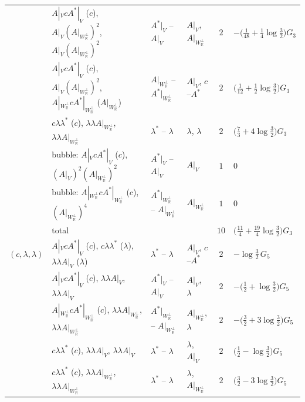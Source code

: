 \begin{tabular}{l|l|l|l|c|l}
 & $A|_VcA^*|_V$ ($c$), $A|_V(A|_{W_{\mathbb R}^\perp})^2$, $A|_V(A|_{W_{\mathbb R}^\perp})^2$ & $A^*|_V$ -- $A|_V$ & $A|_V$, $A|_{W_{\mathbb R}^\perp}$ & $2$ & $-\big(\tfrac1{48}+\tfrac14\log\tfrac32\big)G_3$ \\
 & $A|_VcA^*|_V$ ($c$), $A|_V(A|_{W_{\mathbb R}^\perp})^2$, $A|_{W_{\mathbb R}^\perp}cA^*|_{W_{\mathbb R}^\perp}$ ($A|_{W_{\mathbb R}^\perp}$) & $A|_{W_{\mathbb R}^\perp}$ -- $A^*|_{W_{\mathbb R}^\perp}$ & $A|_V$, $c$--$A^*$ & $2$ & $\big(\tfrac1{12}+\tfrac12\log\tfrac32\big)G_3$ \\
 & $c\lambda\lambda^*$ ($c$), $\lambda\lambda A|_{W_{\mathbb R}^\perp}$, $\lambda\lambda A|_{W_{\mathbb R}^\perp}$ & $\lambda^*$ -- $\lambda$ & $\lambda$, $\lambda$ & $2$ & $\big(\tfrac73+4\log\tfrac32\big)G_3$ \\
 & bubble: $A|_VcA^*|_V$ ($c$), $(A|_V)^2(A|_{W_{\mathbb R}^\perp})^2$ & $A^*|_V$ -- $A|_V$ & $A|_V$ & $1$ & $0$ \\
 & bubble: $A|_{W_{\mathbb R}^\perp}cA^*|_{W_{\mathbb R}^\perp}$ ($c$), $(A|_{W_{\mathbb R}^\perp})^4$ & $A^*|_{W_{\mathbb R}^\perp}$ -- $A|_{W_{\mathbb R}^\perp}$ & $A|_{W_{\mathbb R}^\perp}$ & $1$ & $0$ \\
 & total & & & $10$ & $\big(\tfrac{11}4+\tfrac{19}4\log\tfrac32\big)G_3$ \\
\hline
$(c,\lambda,\lambda)$ & $A|_VcA^*|_V$ ($c$), $c\lambda\lambda^*$ ($\lambda$), $\lambda\lambda A|_V$ ($\lambda$) & $\lambda^*$ -- $\lambda$ & $A|_V$, $c$--$A^*$ & $2$ & $-\log\tfrac32\,G_5$ \\
 & $A|_VcA^*|_V$ ($c$), $\lambda\lambda A|_V$, $\lambda\lambda A|_V$ & $A^*|_V$ -- $A|_V$ & $A|_V$, $\lambda$ & $2$ & $-\big(\tfrac12+\log\tfrac32\big)G_5$ \\
 & $A|_{W_{\mathbb R}^\perp}cA^*|_{W_{\mathbb R}^\perp}$ ($c$), $\lambda\lambda A|_{W_{\mathbb R}^\perp}$, $\lambda\lambda A|_{W_{\mathbb R}^\perp}$ & $A^*|_{W_{\mathbb R}^\perp}$ -- $A|_{W_{\mathbb R}^\perp}$ & $A|_{W_{\mathbb R}^\perp}$, $\lambda$ & $2$ & $-\big(\tfrac32+3\log\tfrac32\big)G_5$ \\
 & $c\lambda\lambda^*$ ($c$), $\lambda\lambda A|_V$, $\lambda\lambda A|_V$ & $\lambda^*$ -- $\lambda$ & $\lambda$, $A|_V$ & $2$ & $\big(\tfrac12-\log\tfrac32\big)G_5$ \\
 & $c\lambda\lambda^*$ ($c$), $\lambda\lambda A|_{W_{\mathbb R}^\perp}$, $\lambda\lambda A|_{W_{\mathbb R}^\perp}$ & $\lambda^*$ -- $\lambda$ & $\lambda$, $A|_{W_{\mathbb R}^\perp}$ & $2$ & $\big(\tfrac32-3\log\tfrac32\big)G_5$ \\

\end{tabular}
